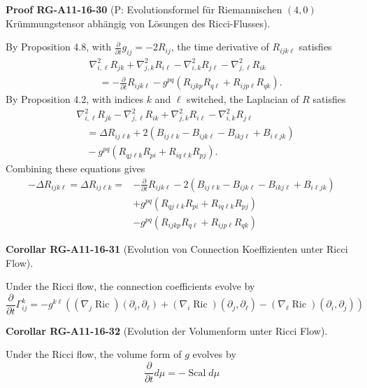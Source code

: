 \documentclass[10pt, letterpaper]{article}
\newcommand{\CustomHeading}[3]{%
  \par\medskip\noindent%
  \textbf{#1 #2} \textnormal{(#3)}.\enskip%
}
\newenvironment{KORO}[2]{\CustomHeading{Corollar}{#1}{#2}}{}
\newenvironment{PROOF}[2]{\CustomHeading{Proof}{#1}{#2}}{}
\begin{document}
\begin{PROOF}{RG-A11-16-30}{P: Evolutionsformel für Riemannischen $(4,0)$ Krümmungstensor abhängig von Lösungen des Ricci-Flusses}
By Proposition 4.8, with $\frac{\partial}{\partial t} g_{i j}=-2 R_{i j}$, the time derivative of $R_{i j k \ell}$ satisfies
$$
\begin{aligned}
& \nabla_{i, \ell}^{2} R_{j k}+\nabla_{j, k}^{2} R_{i \ell}-\nabla_{i, k}^{2} R_{j \ell}-\nabla_{j, \ell}^{2} R_{i k} \\
& \quad=-\frac{\partial}{\partial t} R_{i j k \ell}-g^{p q}\left(R_{i j k p} R_{q \ell}+R_{i j p \ell} R_{q k}\right) .
\end{aligned}
$$
By Proposition 4.2, with indices $k$ and $\ell$ switched, the Laplacian of $R$ satisfies
$$
\begin{aligned}
& \nabla_{i, \ell}^{2} R_{j k}-\nabla_{j, \ell}^{2} R_{i k}+\nabla_{j, k}^{2} R_{i \ell}-\nabla_{i, k}^{2} R_{j \ell} \\
& \quad=\Delta R_{i j \ell k}+2\left(B_{i j \ell k}-B_{i j k \ell}-B_{i k j \ell}+B_{i \ell j k}\right) \\
& \quad-g^{p q}\left(R_{q j \ell k} R_{p i}+R_{i q \ell k} R_{p j}\right) .
\end{aligned}
$$
Combining these equations gives
$$
\begin{aligned}
-\Delta R_{i j k \ell}=\Delta R_{i j \ell k}= & -\frac{\partial}{\partial t} R_{i j k \ell}-2\left(B_{i j \ell k}-B_{i j k \ell}-B_{i k j \ell}+B_{i \ell j k}\right) \\
& +g^{p q}\left(R_{q j \ell k} R_{p i}+R_{i q \ell k} R_{p j}\right) \\
& -g^{p q}\left(R_{i j k p} R_{q \ell}+R_{i j p \ell} R_{q k}\right)
\end{aligned}
$$
\end{PROOF}

\begin{KORO}{RG-A11-16-31}{Evolution von Connection Koeffizienten unter Ricci Flow}
Under the Ricci flow, the connection coefficients evolve by
$$
\frac{\partial}{\partial t} \Gamma_{i j}^{k}=-g^{k \ell}\left(\left(\nabla_{j} \operatorname{Ric}\right)\left(\partial_{i}, \partial_{\ell}\right)+\left(\nabla_{i} \operatorname{Ric}\right)\left(\partial_{j}, \partial_{\ell}\right)-\left(\nabla_{\ell} \operatorname{Ric}\right)\left(\partial_{i}, \partial_{j}\right)\right)
$$
\end{KORO}

\begin{KORO}{RG-A11-16-32}{Evolution der Volumenform unter Ricci Flow}
Under the Ricci flow, the volume form of $g$ evolves by
$$
\frac{\partial}{\partial t} d \mu=-\operatorname{Scal} d \mu
$$
\end{KORO}
\end{document}

